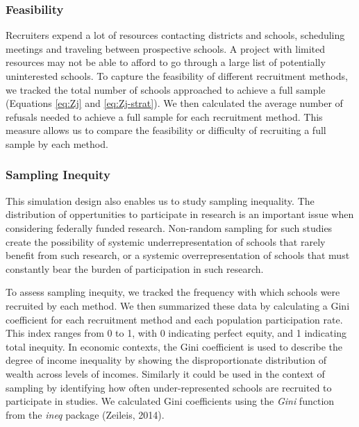 \documentclass[english,man,floatsintext]{apa6}
\begin{document}
\hypertarget{feasibility}{%
\subsubsection{Feasibility}\label{feasibility}}

Recruiters expend a lot of resources contacting districts and schools, scheduling meetings and traveling between prospective schools. A project with limited resources may not be able to afford to go through a large list of potentially uninterested schools. To capture the feasibility of different recruitment methods, we tracked the total number of schools approached to achieve a full sample (Equations \eqref{eq:Zj} and \eqref{eq:Zj-strat}). We then calculated the average number of refusals needed to achieve a full sample for each recruitment method. This measure allows us to compare the feasibility or difficulty of recruiting a full sample by each method.

\hypertarget{sampling-inequity}{%
\subsubsection{Sampling Inequity}\label{sampling-inequity}}

This simulation design also enables us to study sampling inequality. The distribution of oppertunities to participate in research is an important issue when considering federally funded research.
Non-random sampling for such studies create the possibility of systemic underrepresentation of schools that rarely benefit from such research, or a systemic overrepresentation of schools that must constantly bear the burden of participation in such research.  

To assess sampling inequity, we tracked the frequency with which schools were recruited by each method. We then summarized these data by calculating a Gini coefficient for each recruitment method and each population participation rate. This index ranges from 0 to 1, with 0 indicating perfect equity, and 1 indicating total inequity.
In economic contexts, the Gini coefficient is used to describe the degree of income inequality by showing the disproportionate distribution of wealth across levels of incomes. Similarly it could be used in the context of sampling by identifying how often under-represented schools are recruited to participate in studies. We calculated Gini coefficients using the \emph{Gini} function from the \emph{ineq} package (Zeileis, 2014).
\end{document}

